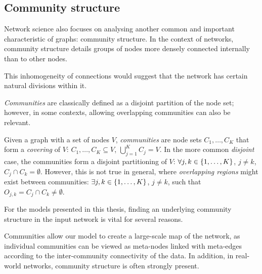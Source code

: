 \begin{algorithm}%
\caption{PageRank}
\label{algorithm:pagerank}
\begin{algorithmic}
\end{algorithmic}
\end{algorithm}

\subsection{Community structure}
Network science also focuses on analysing another common and important characteristic of graphs: community structure. In the context of networks, community structure details groups of nodes more densely connected internally than to other nodes. 

This inhomogeneity of connections would suggest that the network has certain natural divisions within it.

\emph{Communities} are classically defined as a disjoint partition of the node set; however, in some contexts, allowing overlapping communities can also be relevant.
\begin{definition}
Given a graph with a set of nodes $V$, \emph{communities} are node sets $C_1, \dots, C_K$ that form a \emph{covering} of $V$: $C_1, \dots, C_K \subseteq V$, $\bigcup_{j=1}^{K}{C_j} = V$. In the more common \emph{disjoint} case, the communities form a disjoint partitioning of $V$: $\forall j,k \in \mathopen{}\left\{1,\dots,K\right\}$, $j \neq k$, $C_j \cap C_k =\emptyset$. However, this is not true in general, where \emph{overlapping regions} might exist between communities: $\exists j,k \in \mathopen{}\left\{1,\dots,K\right\}$, $j \neq k$, such that $O_{j,k} = C_j \cap C_k \neq \emptyset$.
\end{definition} 

For the models presented in this thesis, finding an underlying community structure in the input network is vital for several reasons. 

Communities allow our model to create a large-scale map of the network, as individual communities can be viewed as meta-nodes linked with meta-edges according to the inter-community connectivity of the data. In addition, in real-world networks, community structure is often strongly present.

